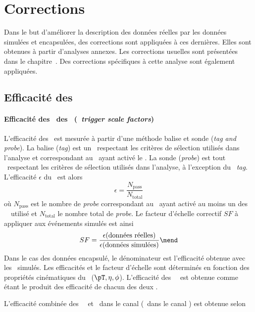 \section{Corrections}\label{chapter-HTT_analysis-section-corrections}
Dans le but d'améliorer la description des données réelles par les données simulées et encapsulées, des corrections sont appliquées à ces dernières.
Elles sont obtenues à partir d'analyses annexes.
Les corrections usuelles sont présentées dans le chapitre~.
Des corrections spécifiques à cette analyse sont également appliquées.
\subsection{Efficacité des \HLTpaths}
\paragraph{Efficacité des \HLTpaths\ des \tauh\ (\emph{\tauh\ trigger scale factors})}
L'efficacité des \HLTpaths\ est mesurée à partir d'une méthode \og balise et sonde \fg{}  (\emph{tag and probe}).
La balise (\emph{tag}) est un \tauh\ respectant les critères de sélection utilisés dans l'analyse et correspondant au \tauh\ ayant activé le \HLTpath.
La sonde (\emph{probe}) est tout \tauh\ respectant les critères de sélection utilisés dans l'analyse, à l'exception du \tauh\ \emph{tag}.
L'efficacité $\epsilon$ du \HLTpath\ est alors
\begin{equation}
\epsilon = \frac{N_\text{pass}}{N_\text{total}}
\end{equation}
où
$N_\text{pass}$ est le nombre de \emph{probe} correspondant au \tauh\ ayant activé au moins un des \HLTpaths\ \HLTSingleTau\ utilisé
et
$N_\text{total}$ le nombre total de \emph{probe}.
Le facteur d'échelle correctif $SF$ à appliquer aux événements simulés est ainsi
\begin{equation}
SF = \frac{\epsilon(\text{données réelles})}{\epsilon(\text{données simulées})}
\mend
\end{equation}
Dans le cas des données encapsulé, le dénominateur est l'efficacité obtenue avec les \tauh\ simulés.
Les efficacités et le facteur d'échelle sont déterminés en fonction des propriétés cinématiques du \tauh\ ($\pT, \eta, \phi$).
L'efficacité des \HLTpaths\ \HLTDoubleTau\ est obtenue comme étant le produit des efficacité de chacun des deux \tauh.
\par
L'efficacité combinée des \HLTpaths\ \HLTSingleTau\ et \HLTSingleMu\ dans le canal \mu\tauh (\HLTSingleEle\ dans le canal \ele\tauh) est obtenue selon
